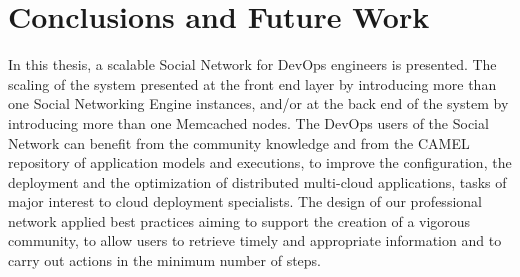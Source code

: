 \chapter{Conclusions and Future Work}
\label{sec:conclusions}
In this thesis, a scalable Social Network for DevOps engineers is presented. The scaling of the system presented at the front end layer by introducing more than one Social Networking Engine instances, and/or at the back end of the system by introducing more than one Memcached nodes. The DevOps users of the Social Network can benefit from the community knowledge and from the CAMEL repository of application models and executions, to improve the configuration, the deployment and the
optimization of distributed multi-cloud applications, tasks of major interest to cloud deployment specialists. The design of our professional network applied best practices aiming to support the creation of a vigorous community, to allow users to retrieve timely and appropriate information and to carry out actions in the minimum number of steps.
